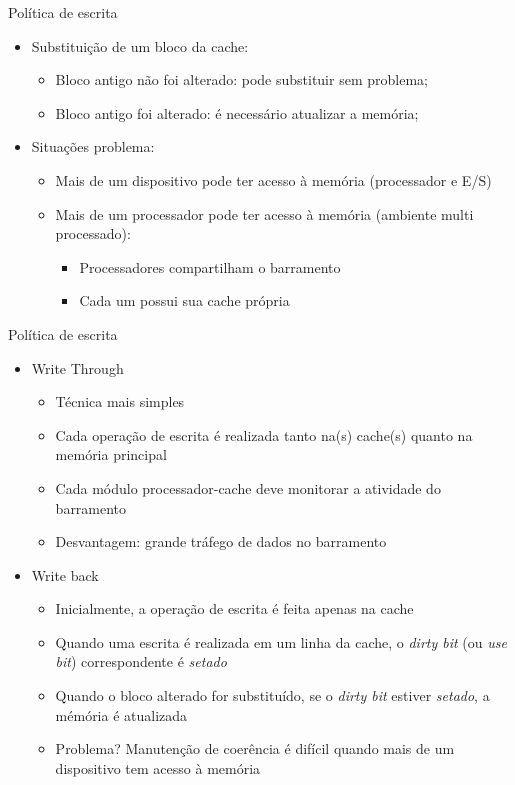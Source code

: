 \begin{slide}{Política de escrita}
\begin{itemize}
   \item Substituição de um bloco da cache:
   \begin{itemize}
      \item Bloco antigo não foi alterado: pode substituir sem problema;
      \item Bloco antigo foi alterado: é necessário atualizar a memória;
   \end{itemize}
   \item Situações problema:
   \begin{itemize}
      \item Mais de um dispositivo pode ter acesso à memória (processador e E/S)
      \item Mais de um processador pode ter acesso à memória (ambiente multi processado):
      \begin{itemize}
         \item Processadores compartilham o barramento
         \item Cada um possui sua cache própria
      \end{itemize}
   \end{itemize}
\end{itemize}
\end{slide}

\begin{slide}{Política de escrita}
\begin{itemize}
   \item Write Through
   \begin{itemize}
      \item Técnica mais simples
      \item Cada operação de escrita é realizada tanto na(s) cache(s) quanto na memória principal
      \item Cada módulo processador-cache deve monitorar a atividade do barramento
      \item Desvantagem: grande tráfego de dados no barramento
   \end{itemize}
   \item Write back
   \begin{itemize}
      \item Inicialmente, a operação de escrita é feita apenas na cache
      \item Quando uma escrita é realizada em um linha da cache, o \emph{dirty bit} (ou \emph{use bit}) correspondente é \emph{setado}
      \item Quando o bloco alterado for substituído, se o \emph{dirty bit} estiver \emph{setado}, a mémória é atualizada
      \item Problema? Manutenção de coerência é difícil quando mais de um dispositivo tem acesso à memória
    \end{itemize}
\end{itemize}
\end{slide}

